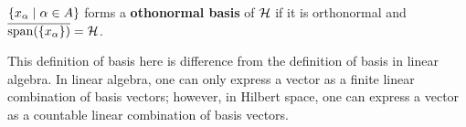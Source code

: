 \begin{definition}
    $\left\{ x_\alpha \;\middle\vert\; \alpha\in A \right\}$ forms a \textbf{othonormal basis} 
    of $\mathcal{H}$ if it is orthonormal and $\overline{\operatorname{span}(\left\{ {x_\alpha} \right\})} = \mathcal{H}$. 
\end{definition}
\begin{remark}
    This definition of basis here is difference from the definition 
    of basis in linear algebra. In linear algebra, one can only 
    express a vector as a finite linear combination of basis vectors; 
    however, in Hilbert space, one can express a vector as a countable 
    linear combination of basis vectors.
\end{remark}